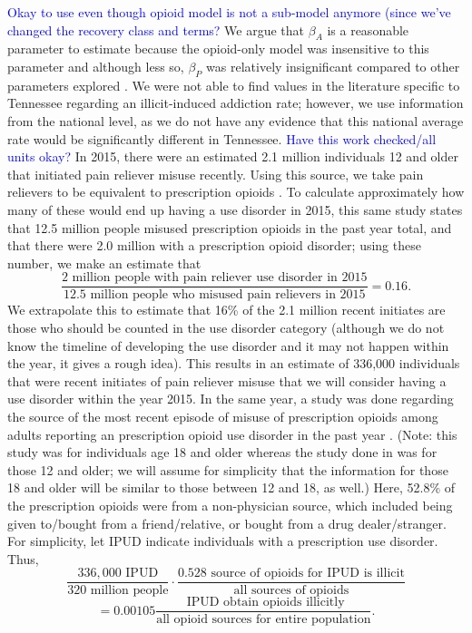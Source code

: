 \documentclass[12pt]{article}
\begin{document}
\textcolor{blue}{Okay to use even though opioid model is not a sub-model anymore (since we've changed the recovery class and terms?} We argue that $\beta_A$ is a reasonable parameter to estimate because the opioid-only model was insensitive to this parameter and although less so, $\beta_P$ was relatively insignificant compared to other parameters explored \cite{Battista}. We were not able to find values in the literature specific to Tennessee regarding an illicit-induced addiction rate; however, we use information from the national level, as we do not have any evidence that this national average rate would be significantly different in Tennessee. \textcolor{blue}{Have this work checked/all units okay?} In 2015, there were an estimated 2.1 million individuals 12 and older that initiated pain reliever misuse recently. Using this source, we take pain relievers to be equivalent to prescription opioids \cite{SAMSHA5}. To calculate approximately how many of these would end up having a use disorder in 2015, this same study states that 12.5 million people misused prescription opioids in the past year total, and that there were 2.0 million with a prescription opioid disorder; using these number, we make an estimate that \\
$$\frac{2 \text{ million people with pain reliever use disorder in 2015}}{12.5 \text{ million people who misused pain relievers in 2015}}=0.16.$$
We extrapolate this to estimate that 16\% of the 2.1 million recent initiates are those who should be counted in the use disorder category (although we do not know the timeline of developing the use disorder and it may not happen within the year, it gives a rough idea). This results in an estimate of 336,000 individuals that were recent initiates of pain reliever misuse that we will consider having a use disorder within the year 2015. In the same year, a study was done regarding the source of the most recent episode of misuse of prescription opioids among adults reporting an prescription opioid use disorder in the past year \cite{Han}. (Note: this study was for individuals age 18 and older whereas the study done in \cite{SAMSHA5} was for those 12 and older; we will assume for simplicity that the information for those 18 and older will be similar to those between 12 and 18, as well.) Here, 52.8\% of the prescription opioids were from a non-physician source, which included being given to/bought from a friend/relative, or bought from a drug dealer/stranger. For simplicity, let IPUD indicate individuals with a prescription use disorder. 
Thus, \\
$$\frac{336,000\text { IPUD}}{320 \text{ million people}}\cdot \frac{0.528 \text{ source of opioids for IPUD is illicit}}{\text{all sources of opioids}}$$
$$=0.00105 \frac{ \text { IPUD obtain opioids illicitly}}{{\text{all opioid sources for entire population}}}.$$
\end{document}
